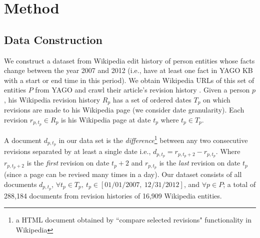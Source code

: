 \section{Method} \label{sec:method}

\subsection{Data Construction} \label{sec:data}
We construct a dataset from Wikipedia edit history of person entities whose facts change between the year 2007 and 2012 (i.e., have at least one fact in YAGO KB \cite{suchanek2007yago} with a start or end time in this period). We obtain Wikipedia URLs of this set of entities $P$ from YAGO and crawl their article's revision history%
. Given a person $p$, his Wikipedia revision history $R_p$ has a set of ordered dates $T_p$ on which revisions are made to his Wikipedia page (we consider date granularity). Each revision $r_{p, t_p} \in R_p$ is his Wikipedia page at date $t_p$ where $t_p \in T_p$. 

A document $d_{p, t_p}$ in our data set is the \textit{difference}\footnote{a HTML document obtained by ``compare selected revisions"  functionality in Wikipedia} between any two consecutive revisions separated by at least a single date i.e., $d_{p, t_p} = r_{p, t_p+2} - r_{p, t_p}$. Where $r_{p, t_p+2}$ is the \textit{first} revision on date $t_p+2$ and $r_{p, {t_p}}$ is the \textit{last} revision on date $t_p$ (since a page can be revised many times in a day). Our dataset consists of all documents $d_{p, t_p}$, $\forall t_p \in T_p,\ t_p \in [01/01/2007,\ 12/31/2012]$, and $\forall p \in P$; a total of 288,184 documents from revision histories of 16,909 Wikipedia entities.


